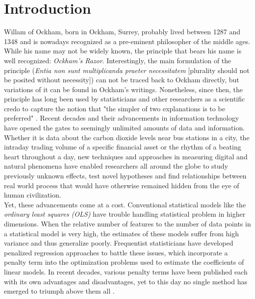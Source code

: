 \documentclass[12pt,a4paper]{article}
\begin{document}
\clearpage

\thispagestyle{plain}
\tableofcontents
\pagebreak
{}

\pagebreak
\section{Introduction}
Willam of Ockham, born in Ockham, Surrey, probably lived between 1287 and 1348 and is nowadays recognized as a pre-eminent philosopher of the middle ages. While his name may not be widely known, the principle that bears his name is well recognized: \textit{Ockham's Razor}. Interestingly, the main formulation of the principle (\textit{Entia non sunt multiplicanda praeter necessitatem} [plurality should not be posited without necessity]) can not be traced back to Ockham directly, but variations of it can be found in Ockham's writings. Nonetheless, since then, the principle has long been used by statisticians and other researchers as a scientific credo to capture the notion that "the simpler of two explanations is to be preferred" \parencite{Lazar2010}. Recent decades and their advancements in information technology have opened the gates to seemingly unlimited amounts of data and information. Whether it is data about the carbon dioxide levels near bus stations in a city, the intraday trading volume of a specific financial asset or the rhythm of a beating heart throughout a day, new techniques and approaches in measuring digital and natural phenomena have enabled researchers all around the globe to study previously unknown effects, test novel hypotheses and find relationships between real world process that would have otherwise remained hidden from the eye of human civilization.\\

Yet, these advancements come at a cost. Conventional statistical models like the \textit{ordinary least squares (OLS)} have trouble handling statistical problem in higher dimensions. When the relative number of features to the number of data points in a statistical model is very high, the estimates of these models suffer from high variance and thus generalize poorly. Frequentist statisticians have developed penalized regression approaches to battle these issues, which incorporate a penalty term into the optimization problems used to estimate the coefficients of linear models. In recent decades, various penalty terms have been published each with its own advantages and disadvantages, yet to this day no single method has emerged to triumph above them all \parencite{WangEtAl2020}.\\
\end{document}
